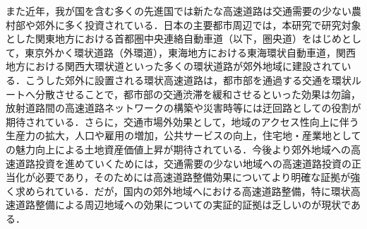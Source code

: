 また近年，我が国を含む多くの先進国では新たな高速道路は交通需要の少ない農村部や郊外に多く投資されている．日本の主要都市周辺では，本研究で研究対象とした関東地方における首都圏中央連絡自動車道（以下，圏央道）をはじめとして，東京外かく環状道路（外環道），東海地方における東海環状自動車道，関西地方における関西大環状道といった多くの環状道路が郊外地域に建設されている．こうした郊外に設置される環状高速道路は，都市部を通過する交通を環状ルートへ分散させることで，都市部の交通渋滞を緩和させるといった効果は勿論，放射道路間の高速道路ネットワークの構築や災害時等には迂回路としての役割が期待されている．さらに，交通市場外効果として，地域のアクセス性向上に伴う生産力の拡大，人口や雇用の増加，公共サービスの向上，住宅地・産業地としての魅力向上による土地資産価値上昇が期待されている．今後より郊外地域への高速道路投資を進めていくためには，交通需要の少ない地域への高速道路投資の正当化が必要であり，そのためには高速道路整備効果についてより明確な証拠が強く求められている．だが，国内の郊外地域へにおける高速道路整備，特に環状高速道路整備による周辺地域への効果についての実証的証拠は乏しいのが現状である．


